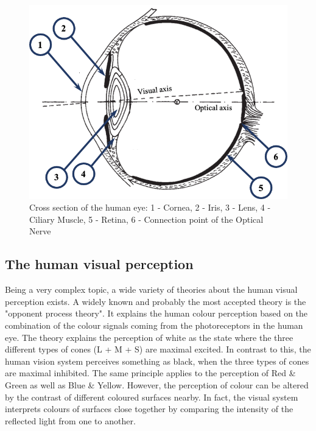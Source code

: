 \begin{figure}
\begin{center}
\includegraphics[width=12cm]{Pictures/HumanEye}
\caption[Cross section of the human eye]{Cross section of the human eye\cite{LoefflerLang2020}: 1 - Cornea, 2 - Iris, 3 - Lens, 4 - Ciliary Muscle, 5 - Retina, 6 - Connection point of the Optical Nerve}
\label{HumanEye}
\end{center}
\end{figure}

\subsection{The human visual perception}
Being a very complex topic, a wide variety of theories about the human visual perception exists. A widely known and probably the most accepted theory is the "opponent process theory". It explains the human colour perception based on the combination of the colour signals coming from the photoreceptors in the human eye. The theory explains the perception of white as the state where the three different types of cones (L + M + S) are maximal excited. In contrast to this, the human vision system perceives something as black, when the three types of cones are maximal inhibited. The same principle applies to the perception of Red \& Green as well as Blue \& Yellow.\cite{Wolfe1957} However, the perception of colour can be altered by the contrast of different coloured surfaces nearby. In fact, the visual system interprets colours of surfaces close together by comparing the intensity of the reflected light from one to another.\cite{Chanal2020}\cite{Gilchrist1979}

